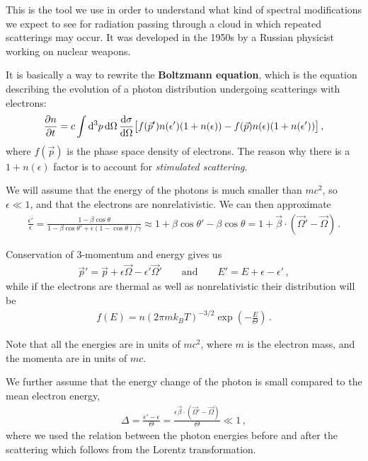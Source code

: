 \documentclass[main.tex]{subfiles}
\begin{document}
This is the tool we use in order to understand what kind of spectral modifications we expect to see for radiation passing through a cloud in which repeated scatterings may occur. 
It was developed in the 1950s by a Russian physicist working on nuclear weapons. 

It is basically a way to rewrite the \textbf{Boltzmann equation}, which is the equation describing the evolution of a photon distribution undergoing scatterings with electrons: 
%
\begin{align}
\pdv{n}{t} = c \int \dd[3]{p} \dd{\Omega } \dv{\sigma }{\Omega } 
\qty[f(\vec{p}') n(\epsilon ') (1 + n(\epsilon )) - f(\vec{p}) n(\epsilon ) (1 + n(\epsilon '))]
\,,
\end{align}
%
where \(f(\vec{p})\) is the phase space density of electrons. 
The reason why there is a \(1 + n(\epsilon )\) factor is to account for \emph{stimulated scattering}.

We will assume that the energy of the photons is much smaller than \(mc^2\), so \(\epsilon \ll 1\), and that the electrons are nonrelativistic. We can then approximate 
%
\begin{align}
\frac{\epsilon'}{\epsilon } = \frac{1 - \beta \cos \theta }{1 - \beta \cos \theta ' + \epsilon (1 - \cos \theta ) / \gamma } \approx 1 + \beta \cos \theta ' - \beta \cos \theta = 1 + \vec{\beta} \cdot (\vec{\Omega}' - \vec{\Omega})
\,.
\end{align}

Conservation of 3-momentum and energy gives us 
%
\begin{align}
\vec{p}' = \vec{p} + \epsilon \vec{\Omega} - \epsilon ' \vec{\Omega}' 
\qquad \text{and} \qquad
E' = E + \epsilon - \epsilon '
\,,
\end{align}
%
while if the electrons are thermal as well as nonrelativistic their distribution will be 
%
\begin{align}
f(E) = n (2 \pi m k_B T)^{-3/2} \exp(- \frac{E}{\Theta }) 
\,.
\end{align}

Note that all the energies are in units of \(mc^2\), where \(m\) is the electron mass, and the momenta are in units of \(mc\). 

We further assume that the energy change of the photon is small compared to the mean electron energy, 
%
\begin{align}
\Delta = \frac{\epsilon ' - \epsilon }{\Theta } = \frac{\epsilon \vec{\beta} \cdot (\vec{\Omega}' - \vec{\Omega})}{\Theta } \ll 1 
\,,
\end{align}
%
where we used the relation between the photon energies before and after the scattering which follows from the Lorentz transformation. 
\end{document}
